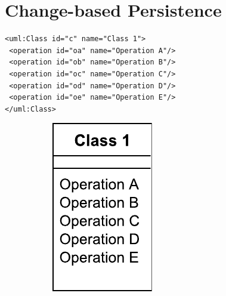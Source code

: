 \documentclass{llncs}
\begin{document}
\section{Change-based Persistence}
\label{sec:change-based_persistence}

\begin{minipage}[t]{0.59\linewidth} 
\centering
\begin{lstlisting}[style=eol,caption={The simplified XMI of the model in Fig. \ref{fig:origin}.},label=lst:originxmi]
<uml:Class id="c" name="Class 1">
 <operation id="oa" name="Operation A"/>
 <operation id="ob" name="Operation B"/>
 <operation id="oc" name="Operation C"/>
 <operation id="od" name="Operation D"/>
 <operation id="oe" name="Operation E"/>
</uml:Class>
\end{lstlisting}
\vspace{-25pt}
\begin{figure}[H]
\centering    
\hfill
\begin{subfigure}[t]{0.2\linewidth}
    \centering
    \includegraphics[width=\linewidth]{images/OriginalClassDiagram}

\end{subfigure}
\end{figure}
\end{minipage}
\end{document}
